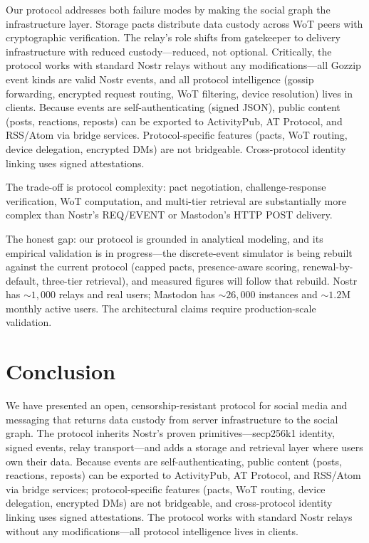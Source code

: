 \documentclass[11pt,a4paper]{article}
\begin{document}
Our protocol addresses both failure modes by making the social graph the infrastructure layer. Storage pacts distribute data custody across WoT peers with cryptographic verification. The relay's role shifts from gatekeeper to delivery infrastructure with reduced custody---reduced, not optional. Critically, the protocol works with standard Nostr relays without any modifications---all Gozzip event kinds are valid Nostr events, and all protocol intelligence (gossip forwarding, encrypted request routing, WoT filtering, device resolution) lives in clients. Because events are self-authenticating (signed JSON), public content (posts, reactions, reposts) can be exported to ActivityPub, AT Protocol, and RSS/Atom via bridge services. Protocol-specific features (pacts, WoT routing, device delegation, encrypted DMs) are not bridgeable. Cross-protocol identity linking uses signed attestations.

The trade-off is protocol complexity: pact negotiation, challenge-response verification, WoT computation, and multi-tier retrieval are substantially more complex than Nostr's REQ/EVENT or Mastodon's HTTP POST delivery.

The honest gap: our protocol is grounded in analytical modeling, and its empirical validation is in progress---the discrete-event simulator is being rebuilt against the current protocol (capped pacts, presence-aware scoring, renewal-by-default, three-tier retrieval), and measured figures will follow that rebuild. Nostr has ${\sim}1{,}000$ relays and real users; Mastodon has ${\sim}26{,}000$ instances and ${\sim}1.2$M monthly active users. The architectural claims require production-scale validation.

\section{Conclusion}

We have presented an open, censorship-resistant protocol for social media and messaging that returns data custody from server infrastructure to the social graph. The protocol inherits Nostr's proven primitives---secp256k1 identity, signed events, relay transport---and adds a storage and retrieval layer where users own their data. Because events are self-authenticating, public content (posts, reactions, reposts) can be exported to ActivityPub, AT Protocol, and RSS/Atom via bridge services; protocol-specific features (pacts, WoT routing, device delegation, encrypted DMs) are not bridgeable, and cross-protocol identity linking uses signed attestations. The protocol works with standard Nostr relays without any modifications---all protocol intelligence lives in clients.
\end{document}
